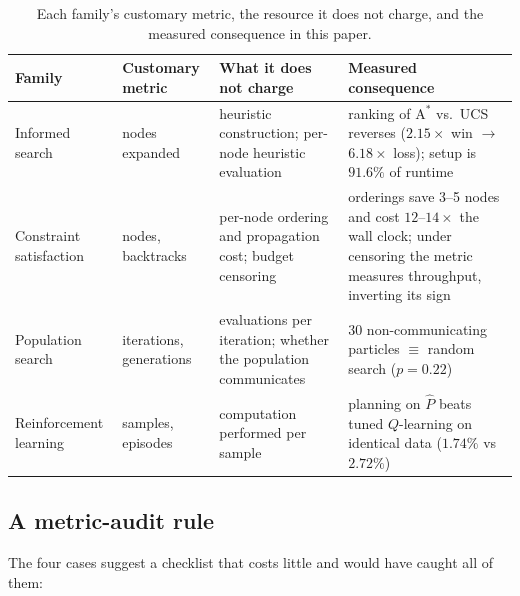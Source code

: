 \documentclass[11pt]{article}
\begin{document}
\begin{table}[t]
\centering
\small
\caption{Each family's customary metric, the resource it does not charge, and the measured
consequence in this paper.}
\label{tab:metrics}
\begin{tabular}{@{}p{2.1cm}p{2.3cm}p{3.4cm}p{5.3cm}@{}}
\toprule
\textbf{Family} & \textbf{Customary metric} & \textbf{What it does not charge} & \textbf{Measured consequence} \\
\midrule
Informed search & nodes expanded & heuristic construction; per-node heuristic evaluation &
  ranking of $\mathrm{A}^*$ vs.\ UCS reverses ($2.15\times$ win $\to$ $6.18\times$ loss);
  setup is $91.6\%$ of runtime \\
\addlinespace
Constraint satisfaction & nodes, backtracks & per-node ordering and propagation cost; budget
  censoring &
  orderings save 3--5 nodes and cost $12$--$14\times$ the wall clock; under censoring the metric
  measures throughput, inverting its sign \\
\addlinespace
Population search & iterations, generations & evaluations per iteration; whether the population
  communicates &
  30 non-communicating particles $\equiv$ random search ($p = 0.22$) \\
\addlinespace
Reinforcement learning & samples, episodes & computation performed per sample &
  planning on $\hat{P}$ beats tuned $Q$-learning on identical data ($1.74\%$ vs $2.72\%$) \\
\bottomrule
\end{tabular}
\end{table}

\subsection{A metric-audit rule}

The four cases suggest a checklist that costs little and would have caught all of them:
\end{document}
